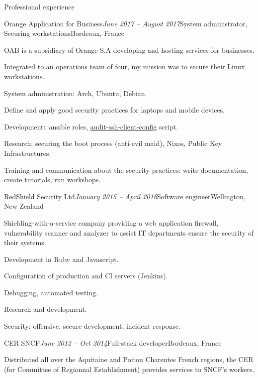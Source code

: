 \begin{rSection}{Professional experience}

  \begin{rSubsection}{Orange Application for Business}{\em June 2017 -- August 2017}{System administrator, Securing workstations}{Bordeaux, France}
    \item[]
      OAB is a subsidiary of Orange S.A developing and hosting services for businesses.
    \item[]
      Integrated to an operations team of four, my mission was to secure their Linux workstations.

    \item System administration: Arch, Ubuntu, Debian.
    \item Define and apply good security practices for laptops and mobile devices.
    \item Development: ansible roles, \href{https://github.com/multimediabs/audit-ssh-client-config}{audit-ssh-client-config} script.
    \item Research: securing the boot process (anti-evil maid), Nixos, Public Key Infrastructures.
    \item Training and communication about the security practices: write documentation, create tutorials, run workshops.
  \end{rSubsection}


  \begin{rSubsection}{RedShield Security Ltd}{\em January 2015 -- April 2016}{Software engineer}{Wellington, New Zealand}
    \item[]
      Shielding-with-a-service company providing a web application firewall, vulnerability scanner and analyzer to assist IT departments ensure the security of their systems.

    \item Development in Ruby and Javascript.
    \item Configuration of production and CI servers (Jenkins).
    \item Debugging, automated testing.
    \item Research and development.
    \item Security: offensive, secure development, incident response.
  \end{rSubsection}


  \begin{rSubsection}{CER SNCF}{\em June 2012 -- Oct 2014}{Full-stack developer}{Bordeaux, France}
    \item[] Distributed all over the Aquitaine and Poitou Charentes French regions, the CER (for Committee of Regionnal Establishment) provides services to SNCF's workers.


\end{rSubsection}
\end{rSection}
